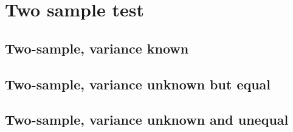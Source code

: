 \documentclass[a4paper,12pt]{article}
\begin{document}
\section{Two sample test}
\label{sec:two-sample-test}


\subsection{Two-sample, variance known}
\label{sec:two-sample-variance}

\subsection{Two-sample, variance unknown but equal}
\label{sec:two-sample-variance-1}

\subsection{Two-sample, variance unknown and unequal}
\label{sec:two-sample-variance-2}
\end{document}
